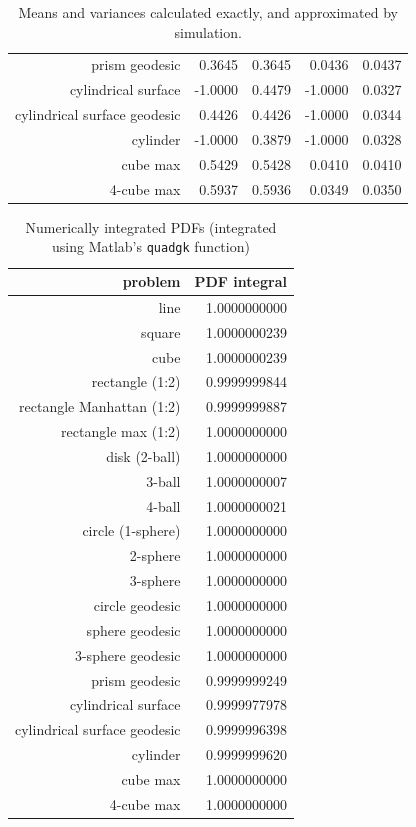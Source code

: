 \begin{table}[ht]
\begin{tabular}{r|rrrr}
           prism geodesic &   0.3645 &         0.3645 &   0.0436 &         0.0437 \\
      cylindrical surface &  -1.0000 &         0.4479 &  -1.0000 &         0.0327 \\
cylindrical surface geodesic &   0.4426 &         0.4426 &  -1.0000 &         0.0344 \\
                 cylinder &  -1.0000 &         0.3879 &  -1.0000 &         0.0328 \\
                 cube max &   0.5429 &         0.5428 &   0.0410 &         0.0410 \\
               4-cube max &   0.5937 &         0.5936 &   0.0349 &         0.0350 \\
  \end{tabular}
  \caption{Means and variances calculated exactly, and approximated by simulation.}
  \label{tab:mean_var_estimates}
\end{table}






\begin{table}[ht]
  \centering
  \begin{tabular}{r|r}
                  problem & PDF integral \\
     \hline 
                     line & 1.0000000000 \\
                   square & 1.0000000239 \\
                     cube & 1.0000000239 \\
          rectangle (1:2) & 0.9999999844 \\
rectangle Manhattan (1:2) & 0.9999999887 \\
      rectangle max (1:2) & 1.0000000000 \\
            disk (2-ball) & 1.0000000000 \\
                   3-ball & 1.0000000007 \\
                   4-ball & 1.0000000021 \\
        circle (1-sphere) & 1.0000000000 \\
                 2-sphere & 1.0000000000 \\
                 3-sphere & 1.0000000000 \\
          circle geodesic & 1.0000000000 \\
          sphere geodesic & 1.0000000000 \\
        3-sphere geodesic & 1.0000000000 \\
           prism geodesic & 0.9999999249 \\
      cylindrical surface & 0.9999977978 \\
cylindrical surface geodesic & 0.9999996398 \\
                 cylinder & 0.9999999620 \\
                 cube max & 1.0000000000 \\
               4-cube max & 1.0000000000 \\
  \end{tabular}
  \caption{Numerically integrated PDFs (integrated using Matlab's {\tt quadgk} function)}
  \label{tab:numerical_pdf_sum}
\end{table}
